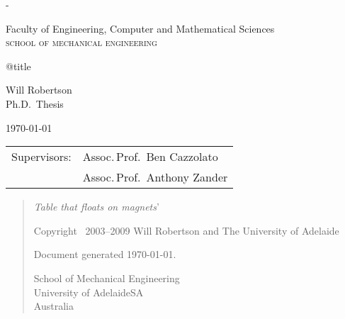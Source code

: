 
\thispagestyle{empty}
\label{titlepage}
\calccentering{\unitlength}
\begin{adjustwidth*}{\unitlength}{-\unitlength} 
\setlength{\parindent}{0pt}

\begin{flushright}
\end{flushright}

\vfill

Faculty of Engineering,
Computer and Mathematical Sciences\\
\textsc{school of mechanical engineering}

\vfill

{\Large\raggedright\csname @title\endcsname}

\vspace{10mm}

Will Robertson\\
Ph.D.\ Thesis
\vspace{10mm}

\today

\vfill

\vfill
    
\begin{tabular}{@{}ll}
Supervisors:    & Assoc.\,Prof.\ Ben Cazzolato  \\
                & Assoc.\,Prof.\ Anthony Zander
\end{tabular}
\end{adjustwidth*}

\newpage
\thispagestyle{empty}
\null
\vfill
\begin{quote} 
  \LARGE
  \textit{Table that floats on magnets}'

  \vfill
  \normalsize
  \raggedright
  Copyright \textcopyright\ 2003--2009 Will Robertson 
  and The University of Adelaide

  \bigskip
  Document generated \today.

  \bigskip
  School of Mechanical Engineering\\
  University of Adelaide\quad SA\\
  Australia\\
\end{quote}

